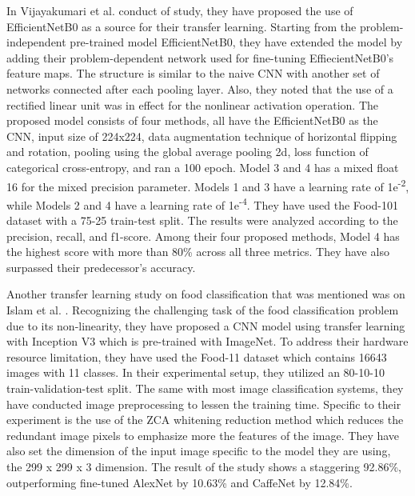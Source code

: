 In Vijayakumari et al. \cite{vijayakumari-2022} conduct of study, they have proposed the use of EfficientNetB0 as a source for their transfer learning. Starting from the problem-independent pre-trained model EfficientNetB0, they have extended the model by adding their problem-dependent network used for fine-tuning EffiecientNetB0's feature maps. The structure is similar to the naive CNN with another set of networks connected after each pooling layer. Also, they noted that the use of a rectified linear unit was in effect for the nonlinear activation operation. The proposed model consists of four methods, all have the EfficientNetB0 as the CNN, input size of 224x224, data augmentation technique of horizontal flipping and rotation, pooling using the global average pooling 2d, loss function of categorical cross-entropy, and ran a 100 epoch. Model 3 and 4 has a mixed float 16 for the mixed precision parameter. Models 1 and 3 have a learning rate of 1e\textsuperscript{-2}, while Models 2 and 4 have a learning rate of 1e\textsuperscript{-4}. They have used the Food-101 dataset \cite{bossard-2014} with a 75-25 train-test split. The results were analyzed according to the precision, recall, and f1-score. Among their four proposed methods, Model 4 has the highest score with more than 80\% across all three metrics. They have also surpassed their predecessor's accuracy. 

Another transfer learning study on food classification that was mentioned was on Islam et al. \cite{islam-2018}. Recognizing the challenging task of the food classification problem due to its non-linearity, they have proposed a CNN model using transfer learning with Inception V3 which is pre-trained with ImageNet. To address their hardware resource limitation, they have used the Food-11 dataset which contains 16643 images with 11 classes. In their experimental setup, they utilized an 80-10-10 train-validation-test split. The same with most image classification systems, they have conducted image preprocessing to lessen the training time. Specific to their experiment is the use of the ZCA whitening reduction method which reduces the redundant image pixels to emphasize more the features of the image. They have also set the dimension of the input image specific to the model they are using, the 299 x 299 x 3 dimension. The result of the study shows a staggering 92.86\%, outperforming fine-tuned AlexNet by 10.63\% and CaffeNet by 12.84\%.

